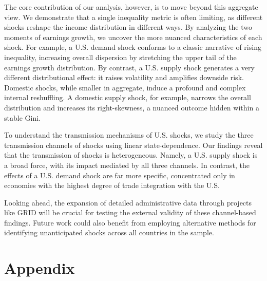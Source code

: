 \documentclass[12pt, a4paper]{article}
\begin{document}
The core contribution of our analysis, however, is to move beyond this aggregate view. We demonstrate that a single inequality metric is often limiting, as different shocks reshape the income distribution in different ways. By analyzing the two moments of earnings growth, we uncover the more nuanced characteristics of each shock. For example, a U.S. demand shock conforms to a classic narrative of rising inequality, increasing overall dispersion by stretching the upper tail of the earnings growth distribution. By contrast, a U.S. supply shock generates a very different distributional effect: it raises volatility and amplifies downside risk. Domestic shocks, while smaller in aggregate, induce a profound and complex internal reshuffling. A domestic supply shock, for example, narrows the overall distribution and increases its right-skewness, a nuanced outcome hidden within a stable Gini.

To understand the transmission mechanisms of U.S. shocks, we study the three transmission channels of shocks using linear state-dependence. Our findings reveal that the transmission of shocks is heterogeneous. Namely, a U.S. supply shock is a broad force, with its impact mediated by all three channels. In contrast, the effects of a U.S. demand shock are far more specific, concentrated only in economies with the highest degree of trade integration with the U.S.

Looking ahead, the expansion of detailed administrative data through projects like GRID will be crucial for testing the external validity of these channel-based findings. Future work could also benefit from employing alternative methods for identifying unanticipated shocks across all countries in the sample.

\newpage
\printbibliography
\pagebreak
\section*{Appendix}
\renewcommand{\thetable}{A\arabic{table}}
\renewcommand{\thefigure}{B\arabic{figure}}
\setcounter{figure}{0}
\setcounter{table}{0}
\end{document}
